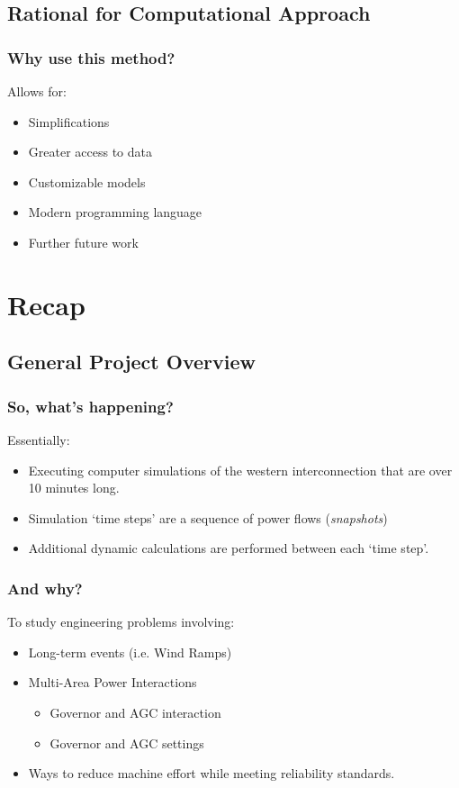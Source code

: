 \documentclass[14pt, unknownkeysallowed]{beamer}
\begin{document}
\subsection{Rational for Computational Approach}
\begin{frame}
\frametitle{Why use this method?}
Allows for:
\begin{itemize}
\item Simplifications
\item Greater access to data
\item Customizable models
\item Modern programming language
\item Further future work
\end{itemize}
\end{frame}
\section{Recap}
\subsection{General Project Overview}
\begin{frame}
\frametitle{So, what's happening?}
Essentially:
\begin{itemize}
	\item Executing computer simulations of the western interconnection that are  over 10 minutes long.
	\item Simulation `time steps' are a sequence of power flows (\emph{snapshots})
	\item Additional dynamic calculations are performed between each `time step'.
\end{itemize}

\end{frame}
\begin{frame}
\frametitle{And why?}
To study engineering problems involving:
\begin{itemize}
	\item Long-term events (i.e. Wind Ramps)
	\item Multi-Area Power Interactions
	\begin{itemize}
		\item Governor and AGC interaction
		\item Governor and AGC settings		
	\end{itemize}
	\item Ways to reduce machine effort while meeting reliability standards.
\end{itemize}
\end{frame}
\end{document}
